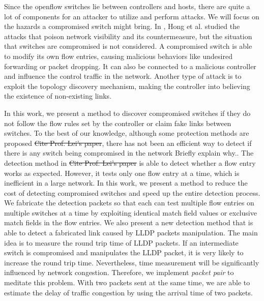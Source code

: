 Since the openflow switches lie between controllers and hosts, there are quite a lot of components for an attacker to utilize and perform attacks. We will focus on the hazards a compromised switch might bring.
In \cite{HXWG15}, Hong et al. studied the attacks that poison network visibility and its countermeasure, but the situation that switches are compromised is not considered. A compromised switch is able to modify its own flow entries, causing malicious behaviors like undesired forwarding or packet dropping. It can also be connected to a malicious controller and influence the control traffic in the network. Another type of attack is to exploit the topology discovery mechanism, making the controller into believing the existence of non-existing links.

In this work, we present a method to discover compromised switches if they do not follow the flow rules set by the controller or claim fake links between switches. To the best of our knowledge, although some protection methods are proposed \cite{CKGL15} \sout{{\color{red} Cite Prof. Lei's paper}}, there has not been an efficient way to detect if there is any switch being compromised in the network {\color{red} Briefly explain why.}. The detection method in \cite{CKGL15}\sout{{\color{red} Cite Prof. Lei's paper}} is able to detect whether a flow entry works as expected. However, it tests only one flow entry at a time, which is inefficient in a large network. In this work, we present a method to reduce the cost of detecting compromised switches and speed up the entire detection process. We fabricate the detection packets so that each can test multiple flow entries on multiple switches at a time by exploiting identical match field values or exclusive match fields in the flow entries. We also present a new detection method that is able to detect a fabricated link caused by LLDP packets manipulation. The main idea is to measure the round trip time of LLDP packets. If an intermediate switch is compromised and manipulates the LLDP packet, it is very likely to increase the round trip time. Nevertheless, time measurement will be significantly influenced by network congestion. Therefore, we implement \textit{packet pair} to meditate this problem. With two packets sent at the same time, we are able to estimate the delay of traffic congestion by using the arrival time of two packets.

